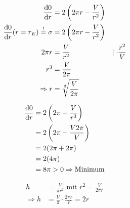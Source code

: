 \begin{align*}
    \frac{\mathop{}\!\mathrm{d} 0}{\mathop{}\!\mathrm{d} r} &= 2 \left( 2 \pi r - \frac{V}{r^2} \right) \\
    \frac{\mathop{}\!\mathrm{d} 0}{\mathop{}\!\mathrm{d} r} (r=r_E) \overset{!}{=} \sigma &= 2 \left( 2 \pi r - \frac{V}{r^2} \right) \\
    2 \pi r &= \frac{V}{r^2} &\mid \cdot \frac{r^2}{V} \\
    r^3 &= \frac{V}{2 \pi} \\
    \Rightarrow r &= \sqrt[3]{\frac{V}{2 \pi}}
\end{align*}

\begin{align*}
    \frac{\mathop{}\!\mathrm{d} 0}{\mathop{}\!\mathrm{d} r} &= 2 \left( 2\pi + \frac{V}{r^3} \right) \\
    &= 2 \left( 2 \pi + \frac{V 2 \pi}{V}  \right) \\
    &= 2 (2 \pi + 2 \pi) \\
    &= 2 (4 \pi) \\
    &= 8 \pi > 0 \Rightarrow \text{Minimum}
\end{align*}

\begin{align*}
    h &= \frac{V}{\pi r^2} \text{ mit } r^2 = \frac{V}{2 \pi r} \\
    \Rightarrow h &= \frac{V}{\pi} \cdot \frac{2 \pi r}{V} = 2r
\end{align*}
